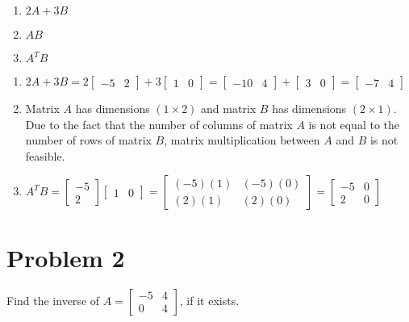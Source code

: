 \documentclass[letter,11pt]{article}
\begin{document}
\begin{enumerate}[label = \roman*.]
    \item $2 A+3 B$
    \item $A B$
    \item $A^{T} B$
\end{enumerate}
\begin{tcolorbox}[boxrule=1mm, width=(.9\linewidth),before=\hfill,after=\hfill,adjusted title={Problem 1 Solutions}]
\begin{enumerate}[label = \roman*.]
    \item $2A+3B = 2\begin{bmatrix}-5 & 2\end{bmatrix} + 3\begin{bmatrix}1 & 0\end{bmatrix} = \begin{bmatrix}-10 & 4\end{bmatrix} + \begin{bmatrix}3 & 0\end{bmatrix} = \begin{bmatrix}-7& 4\end{bmatrix}$
    
    \item Matrix $A$ has dimensions $\left(1 \times 2 \right)$ and matrix $B$ has dimensions $\left(2 \times 1 \right)$. Due to the fact that the number of columns of matrix $A$ is not equal to the number of rows of matrix $B$, matrix multiplication between $A$ and $B$ is not feasible.
    
    \item $A^{T}B = \begin{bmatrix}-5\\ 2\end{bmatrix}\begin{bmatrix}1 & 0\end{bmatrix} = \begin{bmatrix}(-5)(1) & (-5)(0)\\ (2)(1) & (2)(0) \end{bmatrix} = \begin{bmatrix} -5 & 0\\ 2 & 0 \end{bmatrix}$
\end{enumerate}
    
\end{tcolorbox}
    
\section{Problem 2}
Find the inverse of $A=\begin{bmatrix}-5 & 4 \\ 0 & 4\end{bmatrix}$, if it exists.
\end{document}
